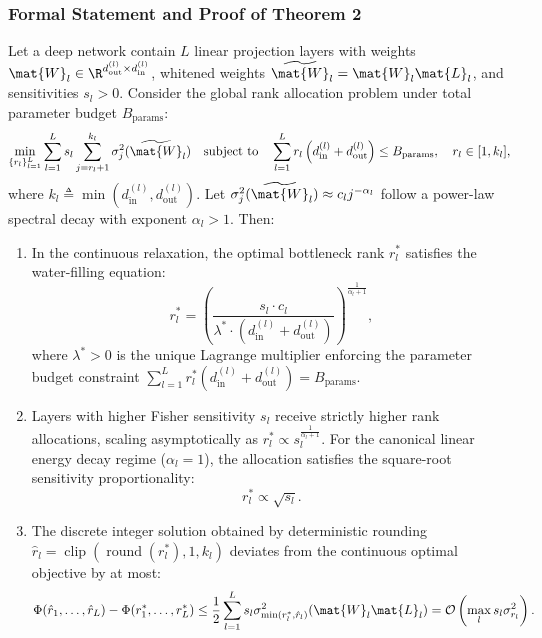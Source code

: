 \subsubsection{Formal Statement and Proof of Theorem 2}

\begin{theorem}
\label{thm:asvd_sensitivity_allocation}
Let a deep network contain $L$ linear projection layers with weights $\mat{W}_l \in \R^{d_{\text{out}}^{(l)} \times d_{\text{in}}^{(l)}}$, whitened weights $\widetilde{\mat{W}}_l = \mat{W}_l \mat{L}_l$, and sensitivities $s_l > 0$. Consider the global rank allocation problem under total parameter budget $B_{\text{params}}$:
\begin{equation}
\min_{\{r_l\}_{l=1}^L} \sum_{l=1}^L s_l \sum_{j=r_l+1}^{k_l} \sigma_j^2(\widetilde{\mat{W}}_l) \quad \text{subject to} \quad \sum_{l=1}^L r_l \left(d_{\text{in}}^{(l)} + d_{\text{out}}^{(l)}\right) \le B_{\text{params}}, \quad r_l \in [1, k_l],
\label{eq:global_budget_opt}
\end{equation}
where $k_l \triangleq \min(d_{\text{in}}^{(l)}, d_{\text{out}}^{(l)})$. Let $\sigma_j^2(\widetilde{\mat{W}}_l) \approx c_l j^{-\alpha_l}$ follow a power-law spectral decay with exponent $\alpha_l > 1$. Then:
\begin{enumerate}
    \item In the continuous relaxation, the optimal bottleneck rank $r_l^*$ satisfies the water-filling equation:
    \begin{equation}
    r_l^* = \left( \frac{s_l \cdot c_l}{\lambda^* \cdot \left(d_{\text{in}}^{(l)} + d_{\text{out}}^{(l)}\right)} \right)^{\frac{1}{\alpha_l + 1}},
    \label{eq:asvd_water_filling_general}
    \end{equation}
    where $\lambda^* > 0$ is the unique Lagrange multiplier enforcing the parameter budget constraint $\sum_{l=1}^L r_l^* (d_{\text{in}}^{(l)} + d_{\text{out}}^{(l)}) = B_{\text{params}}$.
    \item Layers with higher Fisher sensitivity $s_l$ receive strictly higher rank allocations, scaling asymptotically as $r_l^* \propto s_l^{\frac{1}{\alpha_l + 1}}$. For the canonical linear energy decay regime ($\alpha_l = 1$), the allocation satisfies the square-root sensitivity proportionality:
    \begin{equation}
    r_l^* \propto \sqrt{s_l}.
    \label{eq:asvd_sensitivity_sqrt_simple}
    \end{equation}
    \item The discrete integer solution obtained by deterministic rounding $\hat{r}_l = \operatorname{clip}(\operatorname{round}(r_l^*), 1, k_l)$ deviates from the continuous optimal objective by at most:
    \begin{equation}
    \Phi(\hat{r}_1, \dots, \hat{r}_L) - \Phi(r_1^*, \dots, r_L^*) \le \frac{1}{2} \sum_{l=1}^L s_l \sigma_{\min(r_l^*, \hat{r}_l)}^2(\mat{W}_l \mat{L}_l) = \mathcal{O}\left( \max_{l} s_l \sigma_{r_l}^2 \right).
    \label{eq:asvd_rounding_bound}
    \end{equation}
\end{enumerate}
\end{theorem}

